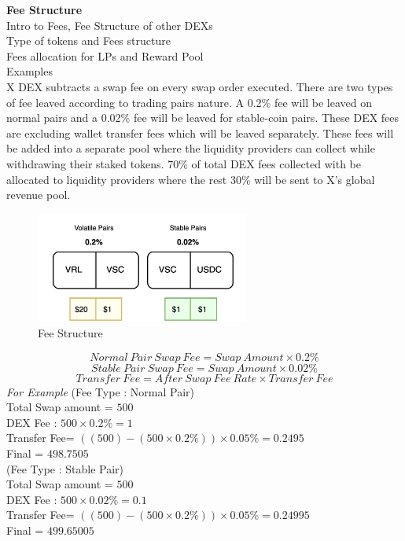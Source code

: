 \documentclass[letterpaper,11pt]{article}
\begin{document}
\textbf{Fee Structure}\\

Intro to Fees, Fee Structure of other DEXs\\
Type of tokens and Fees structure\\
Fees allocation for LPs and Reward Pool\\
Examples\\


X DEX subtracts a swap fee on every swap order executed. There are two types of fee leaved according to trading pairs nature. A 0.2\% fee will be leaved on normal pairs and a 0.02\% fee will be leaved for stable-coin pairs. These DEX fees are excluding wallet transfer fees which will be leaved separately. These fees will be added into a separate pool where the liquidity providers can collect while withdrawing their staked tokens. 70\% of total DEX fees collected with be allocated to liquidity providers where the rest 30\% will be sent to X's global revenue pool.\\

\begin{figure}[H]
\begin{center}
\includegraphics[width=7cm]{dex-fee}
\caption{Fee Structure}
\end{center}
\end{figure}
\[Normal\:Pair\:Swap\:Fee=Swap\:Amount \times  0.2\%\]
\[Stable\:Pair\:Swap\:Fee=Swap\:Amount \times  0.02\%\]
\[Transfer\:Fee=After\:Swap\:Fee\:Rate \times  Transfer\:Fee\]
\textit{For Example} 
(Fee Type : Normal Pair) \\
Total Swap amount = $500$\\
DEX Fee : $500 \times  0.2\% = 1$ \\
Transfer Fee= $((500)-(500 \times  0.2\%)) \times  0.05\% = 0.2495$ \\
Final = $498.7505$\\

(Fee Type : Stable Pair) \\
Total Swap amount = $500$\\
DEX Fee : $500 \times  0.02\% = 0.1$ \\
Transfer Fee= $((500)-(500 \times  0.2\%)) \times  0.05\% = 0.24995$ \\
Final = $499.65005$\\
 
\end{document}
